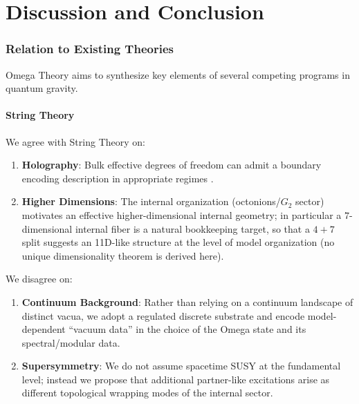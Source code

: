 \part{Discussion and Conclusion}
\label{part:VIII}

\section{Relation to Existing Theories}
\label{chap:relation}

Omega Theory aims to synthesize key elements of several competing programs in quantum gravity.

\subsection{String Theory}
We agree with String Theory on:
\begin{enumerate}
    \item \textbf{Holography}: Bulk effective degrees of freedom can admit a boundary encoding description in appropriate regimes \cite{thooft1993dimensional,susskind1995world}.
    \item \textbf{Higher Dimensions}: The internal organization (octonions/$G_2$ sector) motivates an effective higher-dimensional internal geometry; in particular a $7$-dimensional internal fiber is a natural bookkeeping target, so that a $4{+}7$ split suggests an 11D-like structure at the level of model organization (no unique dimensionality theorem is derived here).
\end{enumerate}
We disagree on:
\begin{enumerate}
    \item \textbf{Continuum Background}: Rather than relying on a continuum landscape of distinct vacua, we adopt a regulated discrete substrate and encode model-dependent ``vacuum data'' in the choice of the Omega state and its spectral/modular data.
    \item \textbf{Supersymmetry}: We do not assume spacetime SUSY at the fundamental level; instead we propose that additional partner-like excitations arise as different topological wrapping modes of the internal sector.
\end{enumerate}

